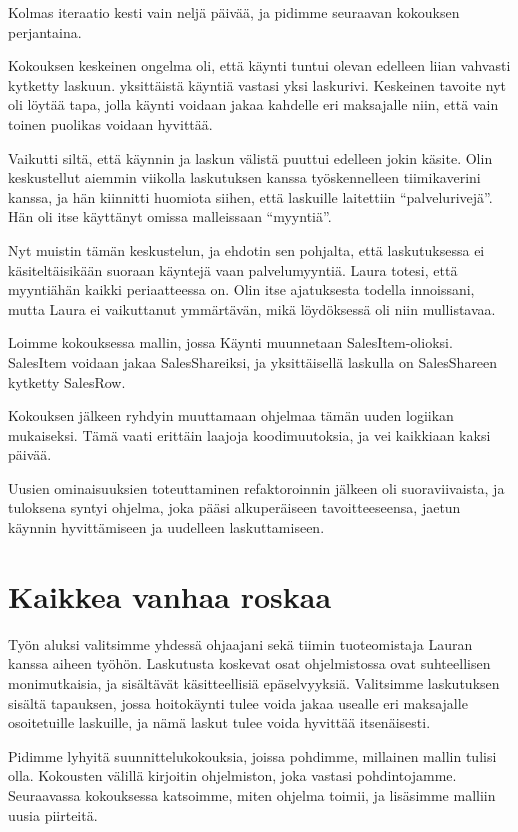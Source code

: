 Kolmas iteraatio kesti vain neljä päivää, ja pidimme seuraavan kokouksen
perjantaina.

Kokouksen keskeinen ongelma oli, että käynti tuntui olevan edelleen
liian vahvasti kytketty laskuun. yksittäistä käyntiä vastasi yksi
laskurivi. Keskeinen tavoite nyt oli löytää tapa, jolla käynti voidaan
jakaa kahdelle eri maksajalle niin, että vain toinen puolikas voidaan
hyvittää.

Vaikutti siltä, että käynnin ja laskun välistä puuttui edelleen jokin
käsite. Olin keskustellut aiemmin viikolla laskutuksen kanssa
työskennelleen tiimikaverini kanssa, ja hän kiinnitti huomiota siihen,
että laskuille laitettiin ``palvelurivejä''. Hän oli itse käyttänyt
omissa malleissaan ``myyntiä''.

Nyt muistin tämän keskustelun, ja ehdotin sen pohjalta, että
laskutuksessa ei käsiteltäisikään suoraan käyntejä vaan palvelumyyntiä.
Laura totesi, että myyntiähän kaikki periaatteessa on. Olin itse
ajatuksesta todella innoissani, mutta Laura ei vaikuttanut ymmärtävän,
mikä löydöksessä oli niin mullistavaa.

Loimme kokouksessa mallin, jossa Käynti muunnetaan SalesItem-olioksi.
SalesItem voidaan jakaa SalesShareiksi, ja yksittäisellä laskulla on
SalesShareen kytketty SalesRow.

Kokouksen jälkeen ryhdyin muuttamaan ohjelmaa tämän uuden logiikan
mukaiseksi. Tämä vaati erittäin laajoja koodimuutoksia, ja vei kaikkiaan
kaksi päivää.

Uusien ominaisuuksien toteuttaminen refaktoroinnin jälkeen oli
suoraviivaista, ja tuloksena syntyi ohjelma, joka pääsi alkuperäiseen
tavoitteeseensa, jaetun käynnin hyvittämiseen ja uudelleen
laskuttamiseen.

\hypertarget{kaikkea-vanhaa-roskaa}{%
\section{Kaikkea vanhaa roskaa}\label{kaikkea-vanhaa-roskaa}}

Työn aluksi valitsimme yhdessä ohjaajani sekä tiimin tuoteomistaja
Lauran kanssa aiheen työhön. Laskutusta koskevat osat ohjelmistossa ovat
suhteellisen monimutkaisia, ja sisältävät käsitteellisiä epäselvyyksiä.
Valitsimme laskutuksen sisältä tapauksen, jossa hoitokäynti tulee voida
jakaa usealle eri maksajalle osoitetuille laskuille, ja nämä laskut
tulee voida hyvittää itsenäisesti.

Pidimme lyhyitä suunnittelukokouksia, joissa pohdimme, millainen mallin
tulisi olla. Kokousten välillä kirjoitin ohjelmiston, joka vastasi
pohdintojamme. Seuraavassa kokouksessa katsoimme, miten ohjelma toimii,
ja lisäsimme malliin uusia piirteitä.


